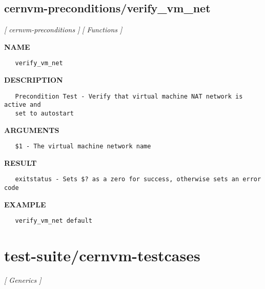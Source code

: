 \subsection{cernvm-preconditions/verify\_vm\_net}
\textsl{[ cernvm-preconditions ]}
\textsl{[ Functions ]}

\label{ch:robo15}
\label{ch:cernvm_preconditions_verify_vm_net}
\textbf{NAME}
\begin{verbatim}
   verify_vm_net
\end{verbatim}
\textbf{DESCRIPTION}
\begin{verbatim}
   Precondition Test - Verify that virtual machine NAT network is active and 
   set to autostart
\end{verbatim}
\textbf{ARGUMENTS}
\begin{verbatim}
   $1 - The virtual machine network name
\end{verbatim}
\textbf{RESULT}
\begin{verbatim}
   exitstatus - Sets $? as a zero for success, otherwise sets an error code
\end{verbatim}
\textbf{EXAMPLE}
\begin{verbatim}
   verify_vm_net default
\end{verbatim}
\newpage
\section{test-suite/cernvm-testcases}
\textsl{[ Generics ]}

